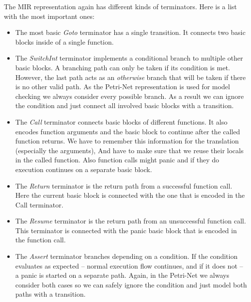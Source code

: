 The MIR representation again has different kinds of terminators. Here is a list with the most important ones:
\begin{itemize}
    \item The most basic \textit{Goto} terminator has a single transition.
    It connects two basic blocks inside of a single function.
    \item The \textit{SwitchInt} terminator implements a conditional branch to multiple other basic blocks.
    A branching path can only be taken if its condition is met.
    However, the last path acts as an \textit{otherwise} branch that will be taken if there is no other valid path.
    As the Petri-Net representation is used for model checking we always consider every possible branch.
    As a result we can ignore the condition and just connect all involved basic blocks with a transition.
    \item The \textit{Call} terminator connects basic blocks of different functions.
    It also encodes function arguments and the basic block to continue after the called function returns.
    We have to remember this information for the translation (especially the arguments),
    And have to make sure that we reuse their locals in the called function.
    Also function calls might panic and if they do execution continues on a separate basic block.
    \item The \textit{Return} terminator is the return path from a successful function call.
    Here the current basic block is connected with the one that is encoded in the Call terminator.
    \item The \textit{Resume} terminator is the return path from an unsuccessful function call.
    This terminator is connected with the panic basic block that is encoded in the function call.
    \item The \textit{Assert} terminator branches depending on a condition.
    If the condition evaluates as expected -- normal execution flow continues, and if it does not -- a panic is started on a separate path.
    Again, in the Petri-Net we always consider both cases so we can safely ignore the condition and just model both paths with a transition.
\end{itemize}

